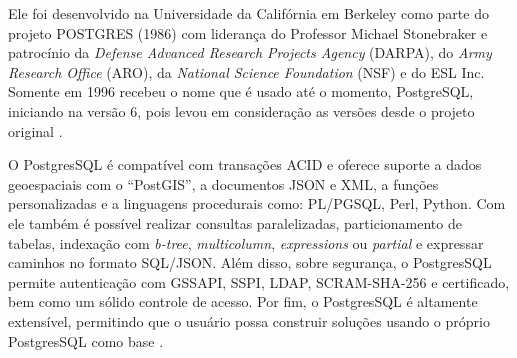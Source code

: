 Ele foi desenvolvido na Universidade da Califórnia em Berkeley como parte do projeto POSTGRES (1986) com liderança do Professor Michael Stonebraker e patrocínio da \textit{Defense Advanced Research Projects Agency} (DARPA), do \textit{Army Research Office} (ARO), da \textit{National Science Foundation} (NSF) e do ESL Inc. Somente em 1996 recebeu o nome que é usado até o momento, PostgreSQL, iniciando na versão 6, pois levou em consideração as versões desde o projeto original \cite{postgresHistory}.

O PostgresSQL é compatível com transações ACID e oferece suporte a dados geoespaciais com o \enquote{PostGIS}, a documentos JSON e XML, a funções personalizadas e a linguagens procedurais como: PL/PGSQL, Perl, Python. Com ele também é possível realizar consultas paralelizadas, particionamento de tabelas, indexação com \textit{b-tree}, \textit{multicolumn}, \textit{expressions} ou \textit{partial} e expressar caminhos no formato SQL/JSON. Além disso, sobre segurança, o PostgresSQL permite autenticação com GSSAPI, SSPI, LDAP, SCRAM-SHA-256 e certificado, bem como um sólido controle de acesso. Por fim, o PostgresSQL é altamente extensível, permitindo que o usuário possa construir soluções usando o próprio PostgresSQL como base \cite{postgresAbout}.